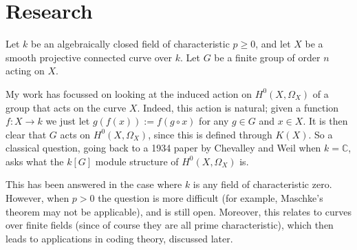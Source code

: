 \documentclass[draft, 11pt, notitlepage]{article} %
\theoremstyle{plain}
\theoremstyle{remark}
\DeclareMathOperator{\ord}{ord}
\begin{document}
\begin{comment}
The space of holomorphic differentials is a subspace of $\Omega_V$, and to define this subspace we need to extend our definition of order to differentials.
Fix a point $P \in V$.
Then we can find a function $x \in K(V)$ such that $\ord_P(x) = 1$, and since $\Omega_V$ is a one-dimensional vector space over $K(X)$ we can write any differential $dy$ as $fdx$ for some $f \in K(V)$.
Given this, we define the order of $dy$ at $P$ to be $\ord_P(dy) = \ord_P(fdx) := \ord_P(f)$.
It can be shown that this is well defined.


then the space of holomorphic differentials are the elements of $\Omega_V$ which have non-negative order everywhere.
This space is denoted $H^0(V,\Omega_V)$.
It should be noted that for the rest of the report we will be considering projective curves, where as what we have described so far are affine curves.
The intuition in both cases is largely the same, but the addition of points at infinity in the projective case makes much of the algebra a lot more natural.
\end{comment}

\section{Research}
Let $k$ be an algebraically closed field of characteristic $p\geq 0$, and let $X$ be a smooth projective connected curve over $k$. 
Let $G$ be a finite group of order $n$ acting on $X$.


My work has focussed on looking at the induced action on $H^0(X,\Omega_X)$ of a group that acts on the curve $X$.
Indeed, this action is natural; given a function $f:X \rightarrow k$ we just let $g(f(x)) := f(g\circ x)$ for any $g \in G$ and $x\in X$.
It is then clear that $G$ acts on $H^0(X,\Omega_X)$, since this is defined through $K(X)$.
So a classical question, going back to a 1934 paper by Chevalley and Weil \cite{chev} when $k = \mathbb C$, asks what the $k[G] $ module structure of $H^0(X,\Omega_X)$ is.
 
This has been answered in the case where $k$ is any field of characteristic zero. However, when $p>0$ the question is more difficult (for example, Maschke's theorem may not be applicable), and is still open. 
Moreover, this relates to curves over finite fields (since of course they are all prime characteristic), which then leads to applications in coding theory, discussed later.
\end{document}
